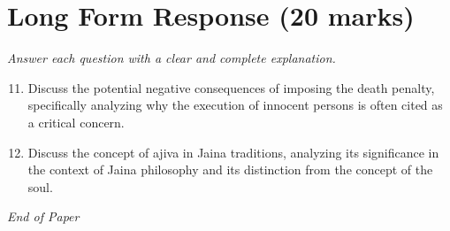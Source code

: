 \documentclass[12pt]{article}
\begin{document}
\section*{Long Form Response (20 marks)}
\textit{Answer each question with a clear and complete explanation.}
\begin{enumerate}[label=\arabic*.]
\setcounter{enumi}{10}
\item Discuss the potential negative consequences of imposing the death penalty, specifically analyzing why the execution of innocent persons is often cited as a critical concern.
\item Discuss the concept of ajiva in Jaina traditions, analyzing its significance in the context of Jaina philosophy and its distinction from the concept of the soul.
\end{enumerate}

\vfill
\noindent\textit{End of Paper}
\end{document}

